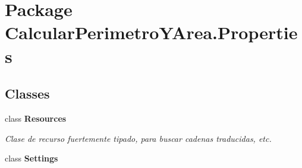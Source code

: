 \hypertarget{namespace_calcular_perimetro_y_area_1_1_properties}{}\section{Package Calcular\+Perimetro\+Y\+Area.\+Properties}
\label{namespace_calcular_perimetro_y_area_1_1_properties}
\subsection*{Classes}
\begin{DoxyCompactItemize}
\item 
class {\bfseries Resources}
\begin{DoxyCompactList}\small\item\em Clase de recurso fuertemente tipado, para buscar cadenas traducidas, etc. \end{DoxyCompactList}\item 
class {\bfseries Settings}
\end{DoxyCompactItemize}
